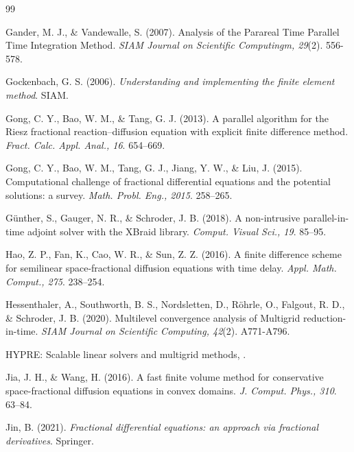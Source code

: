 \begin{thebibliography}{99}
\begin{LTRbibitems}
Gander, M. J., \& Vandewalle, S.
(2007).
Analysis of the Parareal Time Parallel Time Integration Method.
\textit{SIAM Journal on Scientific Computingm, 29}(2).
556-578.

Gockenbach, G. S.
(2006).
\textit{Understanding and implementing the finite element method}.
SIAM.

Gong, C. Y., Bao, W. M., \& Tang, G. J.
(2013).
A parallel algorithm for the Riesz fractional reaction–diffusion equation with explicit finite difference method.
\textit{Fract. Calc. Appl. Anal., 16}.
654–669.

Gong, C. Y., Bao, W. M., Tang, G. J., Jiang, Y. W., \& Liu, J.
(2015).
Computational challenge of fractional differential equations and the potential solutions: a survey.
\textit{Math. Probl. Eng., 2015}.
258–265.

Günther, S., Gauger, N. R., \&  Schroder, J. B.
(2018).
A non-intrusive parallel-in-time adjoint solver with the XBraid library.
\textit{Comput. Visual Sci., 19}.
85–95.

Hao, Z. P., Fan, K., Cao, W. R., \& Sun, Z. Z. 
(2016).
A finite difference scheme for semilinear space-fractional diffusion equations with time delay.
\textit{Appl. Math. Comput., 275}.
238–254.

Hessenthaler, A., Southworth, B. S., Nordsletten, D., R\"{o}hrle, O., Falgout, R. D., \& Schroder, J. B.
(2020).
Multilevel convergence analysis of Multigrid reduction-in-time.
\textit{SIAM Journal on Scientific Computing, 42}(2).
A771-A796.

HYPRE: Scalable linear solvers and multigrid methods, 
\href{https://llnl.gov/casc/hypre}{}.

Jia, J. H., \& Wang, H.
(2016).
A fast finite volume method for conservative space-fractional diffusion equations in convex domains.
\textit{J. Comput. Phys., 310}.
63–84.

Jin, B.
(2021).
\textit{Fractional differential equations: an approach via fractional derivatives}.
Springer.


\end{LTRbibitems}
\end{thebibliography}
